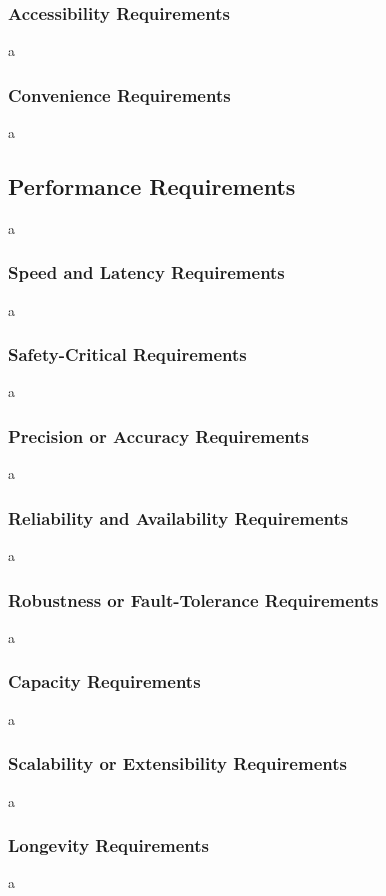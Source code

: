 \documentclass[12pt]{article}
\begin{document}
\subsubsection{Accessibility Requirements}
a

\subsubsection{Convenience Requirements}
a

\subsection{Performance Requirements}
a

\subsubsection{Speed and Latency Requirements}
a

\subsubsection{Safety-Critical Requirements}
a

\subsubsection{Precision or Accuracy Requirements}
a

\subsubsection{Reliability and Availability Requirements}
a

\subsubsection{Robustness or Fault-Tolerance Requirements}
a

\subsubsection{Capacity Requirements}
a

\subsubsection{Scalability or Extensibility Requirements}
a

\subsubsection{Longevity Requirements}
a
\end{document}

